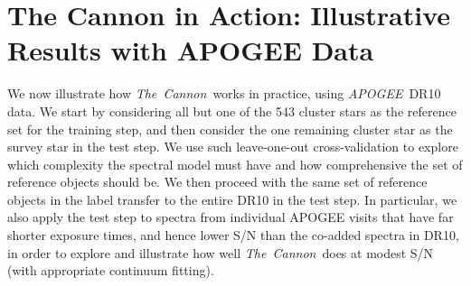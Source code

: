 \documentclass[12pt, preprint]{aastex}
\newcommand{\tc}{\textsl{The~Cannon}}
\newcommand{\apogee}{\textsl{APOGEE}}
\begin{document}
\section{The Cannon in Action: Illustrative Results with APOGEE Data}
\label{sec:results}


We now illustrate how \tc\ works in practice, using \apogee\ DR10 data.
We start by considering all but one of the 543 cluster stars as the reference set for the training step, and then consider the one remaining cluster star as the survey star in the test step. We use such leave-one-out cross-validation to explore which complexity the spectral model must have and how comprehensive the set of reference objects should be. We then proceed with the same set of reference objects in the label transfer to the entire DR10 in the test step. In particular, we also apply the test step to spectra from individual APOGEE visits that have far shorter exposure times, and hence lower S/N than the co-added spectra in DR10, in order to explore and illustrate how well \tc\ does at modest S/N (with appropriate continuum fitting).


\end{document}
